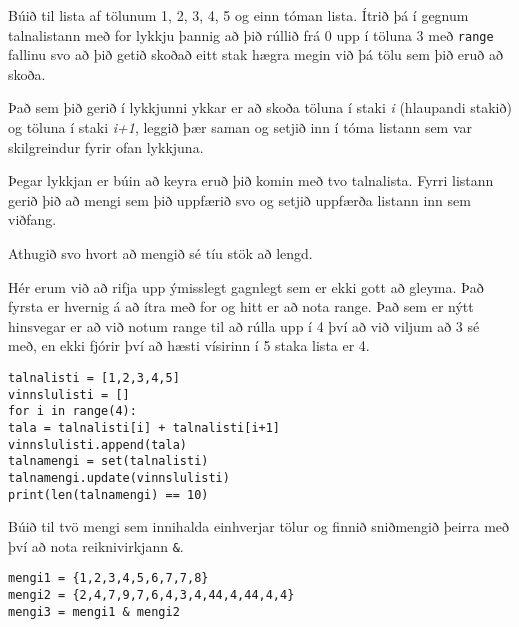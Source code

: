 \begin{exercise}\label{set3}
Búið til lista af tölunum 1, 2, 3, 4, 5 og einn tóman lista.
Ítrið þá í gegnum talnalistann með for lykkju þannig að þið rúllið frá 0 upp í töluna 3 með \texttt{range} fallinu svo að þið getið skoðað eitt stak hægra megin við þá tölu sem þið eruð að skoða.

Það sem þið gerið í lykkjunni ykkar er að skoða töluna í staki \textit{i} (hlaupandi stakið) og töluna í staki \textit{i+1}, leggið þær saman og setjið inn í tóma listann sem var skilgreindur fyrir ofan lykkjuna.

Þegar lykkjan er búin að keyra eruð þið komin með tvo talnalista.
Fyrri listann gerið þið að mengi sem þið uppfærið svo og setjið uppfærða listann inn sem viðfang.

Athugið svo hvort að mengið sé tíu stök að lengd.
\end{exercise}
\begin{Answer}[ref={set3}]
Hér erum við að rifja upp ýmisslegt gagnlegt sem er ekki gott að gleyma.
Það fyrsta er hvernig á að ítra með for og hitt er að nota range.
Það sem er nýtt hinsvegar er að við notum range til að rúlla upp í 4 því að við viljum að 3 sé með, en ekki fjórir því að hæsti vísirinn í 5 staka lista er 4.

	\begin{lstlisting}
talnalisti = [1,2,3,4,5]
vinnslulisti = []
for i in range(4):
tala = talnalisti[i] + talnalisti[i+1]
vinnslulisti.append(tala)
talnamengi = set(talnalisti)
talnamengi.update(vinnslulisti)
print(len(talnamengi) == 10)\end{lstlisting}
\end{Answer}

\begin{exercise}\label{set4}
Búið til tvö mengi sem innihalda einhverjar tölur og finnið sniðmengið þeirra með því að nota reiknivirkjann \texttt{\&}.
\end{exercise}
\begin{Answer}[ref={set4}]
\begin{lstlisting}
mengi1 = {1,2,3,4,5,6,7,7,8}
mengi2 = {2,4,7,9,7,6,4,3,4,44,4,44,4,4}
mengi3 = mengi1 & mengi2\end{lstlisting}
\end{Answer}